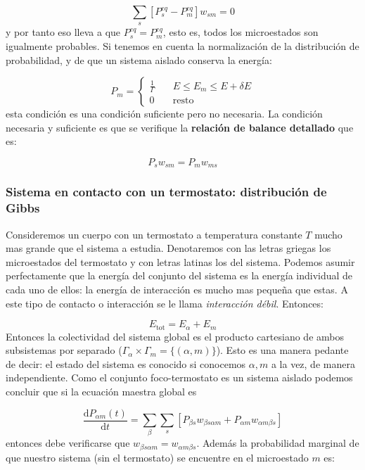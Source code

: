 \documentclass[12pt,a4paper]{article}
\numberwithin{equation}{section}
\numberwithin{figure}{section}
\newcommand{\ccorchetes}[1]{\left[ #1  \right]}
\newcommand{\D}{\mathrm{d}}
\newcommand{\derivadas}[2]{\frac{\D #1}{\D #2}}
\theoremstyle{definition}
\begin{document}
\begin{equation}
\sum_s \ccorchetes{ P_s^{eq}  - P_m^{eq}} w_{sm}= 0 
\end{equation}
y por tanto eso lleva a que $P_s^{eq} = P_m^{eq}$, esto es, todos los microestados son igualmente probables. Si tenemos en cuenta la normalización de la distribución de probabilidad, y de que un sistema aislado conserva la energía:

\begin{equation}
P_m  = \left\lbrace \begin{array}{ll}
\frac{1}{\Gamma} \quad & E \leq E_m \leq E+ \delta E \\
0 \quad  & \mathrm{resto}
\end{array} \right.
\end{equation}
esta condición es una condición suficiente pero no necesaria. La condición necesaria y suficiente es que se verifique la \textbf{relación de balance detallado} que es:

\begin{equation}
P_s w_{sm} = P_m w_{ms}
\end{equation}

\subsubsection{Sistema en contacto con un termostato: distribución de Gibbs}

Consideremos un cuerpo con un termostato a temperatura constante $T$ mucho mas grande que el sistema a estudia. Denotaremos con las letras griegas los microestados del termostato y con letras latinas los del sistema. Podemos asumir perfectamente que la energía del conjunto del sistema es la energía individual de cada uno de ellos: la energía de interacción es mucho mas pequeña que estas. A este tipo de contacto o interacción se le llama \textit{interacción débil}. Entonces:

\begin{equation}
E_{\mathrm{tot}} = E_\alpha + E_m
\end{equation}
Entonces la colectividad del sistema global es el producto cartesiano de ambos subsistemas por separado ($\Gamma_\alpha \times \Gamma_m = \{ (\alpha,m) \}$). Esto es una manera pedante de decir: el estado del sistema es conocido si conocemos $\alpha,m$ a la vez, de manera independiente. Como el conjunto foco-termostato es un sistema aislado podemos concluir que si la ecuación maestra global es

\begin{equation}
\derivadas{P_{\alpha m} (t)}{t} = \sum_\beta \sum_s \ccorchetes{P_{\beta s} w_{\beta s \alpha m} + P_{\alpha m} w_{\alpha m \beta s}}
\end{equation}
entonces debe verificarse que $w_{\beta s \alpha m}=w_{\alpha m \beta s}$. Además la probabilidad marginal de que nuestro sistema (sin el termostato) se encuentre en el microestado $m$ es:
\end{document}
